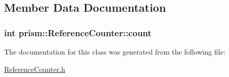 \subsection{Member Data Documentation}
\subsubsection[{\texorpdfstring{count}{count}}]{\setlength{\rightskip}{0pt plus 5cm}int prism\+::\+Reference\+Counter\+::count}\hypertarget{classprism_1_1_reference_counter_a18e28845491bc0d8632a4075c8f341a9}{}\label{classprism_1_1_reference_counter_a18e28845491bc0d8632a4075c8f341a9}


The documentation for this class was generated from the following file\+:\begin{DoxyCompactItemize}
\item 
\hyperlink{_reference_counter_8h}{Reference\+Counter.\+h}\end{DoxyCompactItemize}
